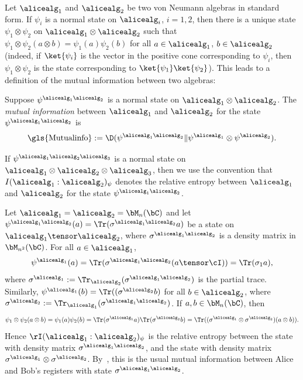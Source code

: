 Let $\alicealg_1$ and $\alicealg_2$ be two von Neumann algebras in standard form. If $\psi_i$ is a normal state on $\alicealg_i$, $i=1,2$, then there is a unique state $\psi_1 \otimes \psi_2$ on $\alicealg_1 \otimes \alicealg_2$ such that $\psi_1 \otimes \psi_2 (a \otimes b) = \psi_1(a) \psi_2(b)$ for all $a \in \alicealg_1$, $b \in \alicealg_2$ (indeed, if $\ket{\psi_i}$ is the vector in the
positive cone corresponding to $\psi_i$, then $\psi_1 \otimes \psi_2$ is the state corresponding to $\ket{\psi_1}\ket{\psi_2}$). This 
leads to a definition of the mutual information between two algebras:
\begin{definition} \label{def:mutual_info_min}
	Suppose $\psi^{\alicealg_1 \alicealg_2}$ is a normal state on $\alicealg_1 \otimes \alicealg_2$. The \textit{mutual information}
	between $\alicealg_1$ and $\alicealg_2$ for the state $\psi^{\alicealg_1 \alicealg_2}$ is
	\begin{equation*}
		\text{\gls{Mutualinfo}} := \D(\psi^{\alicealg_1 \alicealg_2} \| \psi^{\alicealg_1}\otimes \psi^{\alicealg_2}).
	\end{equation*}
\end{definition}
If $\psi^{\alicealg_1 \alicealg_2 \alicealg_3}$ is a normal state on $\alicealg_1 \otimes \alicealg_2 \otimes \alicealg_3$, then we use the convention that $I(\alicealg_1 : \alicealg_2)_{\psi}$ denotes the relative entropy between $\alicealg_1$ and $\alicealg_2$ for the state $\psi^{\alicealg_1 \alicealg_2}$. 
\begin{example}
	Let $\alicealg_1 = \alicealg_2 = \bM_n (\bC)$ and let $\psi^{\alicealg_1 \alicealg_2}(a) = \Tr(\sigma^{\alicealg_1 \alicealg_2} a)$ be a state on $\alicealg_1 \tensor \alicealg_2$, where $\sigma^{\alicealg_1 \alicealg_2}$ is a density matrix in $\bM_{n^2}(\bC) $. For all $a \in \alicealg_1$, 
	\begin{equation*}
		\psi^{\alicealg_1}(a) = \Tr(\sigma^{\alicealg_1 \alicealg_2} (a \tensor \cI)) = \Tr( \sigma_1 a), %
	\end{equation*}
	where $\sigma^{\alicealg_1} := \Tr_{\alicealg_2}(\sigma^{\alicealg_1 \alicealg_2})$ is the partial trace. Similarly, $\psi^{\alicealg_1}(b) = \Tr((\sigma^{\alicealg_2} b)$ for all $b \in \alicealg_2$, where $\sigma^{\alicealg_2} := \Tr_{\alicealg_1} (\sigma^{\alicealg_1 \alicealg_2})$. If $a,b \in \bM_n(\bC)$, then 
	\begin{equation*}
		\psi_1 \otimes \psi_2 (a \otimes b) = \psi_1(a) \psi_2(b) = \Tr(\sigma^{\alicealg_1} a) \Tr(\sigma^{\alicealg_2} b) = \Tr((\sigma^{\alicealg_1} \otimes \sigma^{\alicealg_2})(a \otimes b)).
	\end{equation*}
	Hence $\rI(\alicealg_1 : \alicealg_2)_{\psi}$ is the relative entropy between the state with density matrix $\sigma^{\alicealg_1 \alicealg_2}$, and the state with density matrix $\sigma^{\alicealg_1} \otimes \sigma^{\alicealg_2}$. By~, this is the usual mutual information between Alice and Bob's registers with state $\sigma^{\alicealg_1 \alicealg_2}$. 
\end{example}
